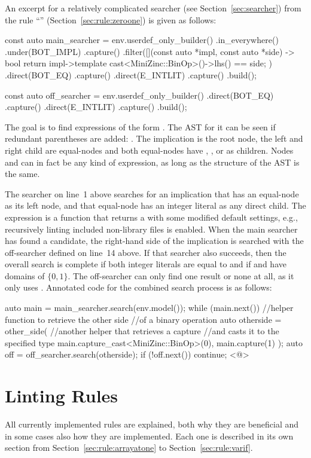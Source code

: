 \documentclass[a4paper,12pt]{article}
\newcommand{\ruleref}[1]{``\nameref{sec:rule:#1}'' (Section~\ref{sec:rule:#1})}
\begin{document}
An excerpt for a relatively complicated searcher (see Section~\ref{sec:searcher}) from the rule \ruleref{zeroone} is given
as follows:
\begin{cppp}
const auto main_searcher = env.userdef_only_builder()
  .in_everywhere()
  .under(BOT_IMPL)
  .capture()
  .filter([](const auto *impl, const auto *side) -> bool {
    return impl->template cast<MiniZinc::BinOp>()->lhs() == side;
  })
  .direct(BOT_EQ)
  .capture()
  .direct(E_INTLIT)
  .capture()
  .build();

const auto off_searcher = env.userdef_only_builder()
  .direct(BOT_EQ)
  .capture()
  .direct(E_INTLIT)
  .capture()
  .build();
\end{cppp}

The goal is to find expressions of the form .
The AST for it can be seen if redundant parentheses are added: .
The implication is the root node, the left and right child are equal-nodes and both
equal-nodes have , , or  as children. Nodes  and  can in fact be
any kind of expression, as long as the structure of the AST is the same.

The searcher on line~1 above searches for an implication that has an equal-node as its left node,
and that equal-node has an integer literal as any direct child. The expression
 is a function that returns a  with some
modified default settings, e.g., recursively linting included non-library files is enabled.
When the main searcher has found a candidate, the right-hand side of the implication is
searched with the off-searcher defined on line~14 above. If that searcher also succeeds, then the
overall search is complete if both integer literals are equal to  and if  and
 have domains of $\{0,1\}$. The off-searcher can only find one result or none at
all, as it only uses . Annotated code for the combined search process is as follows:
\begin{cppp}
auto main = main_searcher.search(env.model());
while (main.next()) {
  //helper function to retrieve the other side
  //of a binary operation
  auto otherside = other_side(
    //another helper that retrieves a capture
    //and casts it to the specified type
    main.capture_cast<MiniZinc::BinOp>(0),
    main.capture(1)
    );
  auto off = off_searcher.search(otherside);
  if (!off.next())
    continue;
  <@\vdots@>
}
\end{cppp}

\section{Linting Rules}\label{sec:rules}
All currently implemented rules are explained, both why they are beneficial
and in some cases also how they are implemented. Each one is described in its own section from
Section~\ref{sec:rule:arrayatone} to Section~\ref{sec:rule:varif}.
\end{document}
